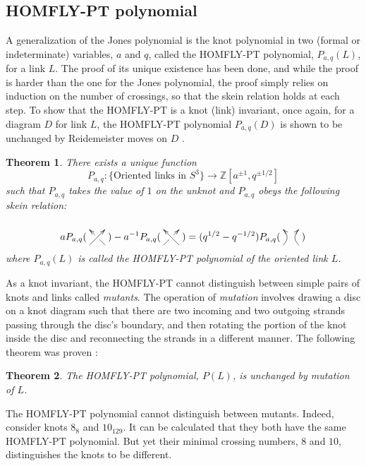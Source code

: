 \documentclass[a4paper,titlepage,twoside]{book}
\newtheorem{theorem}{Theorem}
\begin{document}
\subsection{HOMFLY-PT polynomial}

A generalization of the Jones polynomial is the knot polynomial in two (formal or indeterminate) variables, $a$ and $q$, called the HOMFLY-PT polynomial, $P_{a,q}(L)$, for a link $L$.  The proof of its unique existence has been done, and while the proof is harder than the one for the Jones polynomial, the proof simply relies on induction on the number of crossings, so that the skein relation holds at each step.  To show that the HOMFLY-PT is a knot (link) invariant, once again, for a diagram $D$ for link $L$, the HOMFLY-PT polynomial $P_{a,q}(D)$ is shown to be unchanged by Reidemeister moves on $D$ \cite{Lickorish1997}.   

\begin{theorem}
  There exists a unique function 
\[
  P_{a,q}: \lbrace \text{Oriented links in $S^3$} \rbrace \to \mathbb{Z}[a^{\pm 1 }, q^{ \pm 1/2 } ]
\]
such that $P_{a,q}$ takes the value of $1$ on the unknot and $P_{a,q}$ obeys the following skein relation:

\begin{equation}
a P_{a,q}( \xygraph{
  !{0;/r1.3pc/:}
  [u(0.5)]!{\xoverv[-1]=>}
})  -a^{-1 }P_{a,q}(  \xygraph{
  !{0;/r1.3pc/:}
  [u(0.5)]!{\xunderv[-1]=>}
  } ) = (q^{1/2}- q^{-1/2} ) P_{a,q}( \xygraph{
  !{0;/r1.3pc/:}
  [u(0.5)]!{\xunoverv[-1]=>}
} )
\end{equation}
where $P_{a,q}(L)$ is called the HOMFLY-PT polynomial of the oriented link $L$.  
\end{theorem}

As a knot invariant, the HOMFLY-PT cannot distinguish between simple pairs of knots and links called \emph{mutants}.  The operation of \emph{mutation} involves drawing a disc on a knot diagram such that there are two incoming and two outgoing strands passing through the disc's boundary, and then rotating the portion of the knot inside the disc and reconnecting the strands in a different manner.  The following theorem was proven \cite{Lickorish1997}:

\begin{theorem}
  The HOMFLY-PT polynomial, $P(L)$, is unchanged by mutation of $L$.  
\end{theorem}
The HOMFLY-PT polynomial cannot distinguish between mutants.  Indeed, consider knots $8_8$ and $10_{129}$.  It can be calculated that they both have the same HOMFLY-PT polynomial.  But yet their minimal crossing numbers, $8$ and $10$, distinguishes the knots to be different.  
\end{document}
